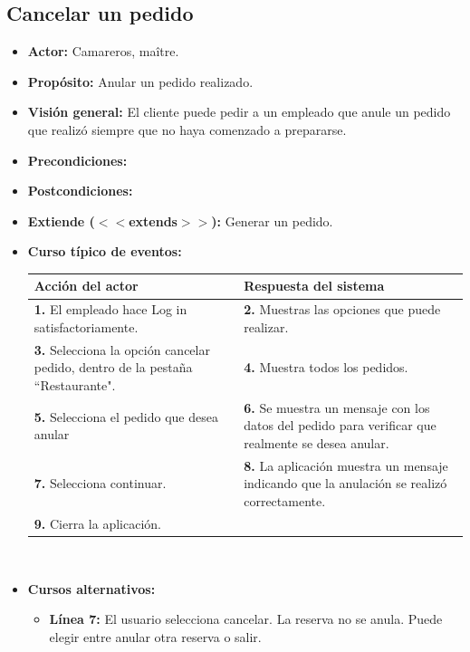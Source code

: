 \documentclass[spanish,a4paper,11pt, twoside]{report}	%
\begin{document}
		\subsection{Cancelar un pedido}
			\begin{itemize}
			\item \textbf{Actor:} Camareros, maître.
			\item \textbf{Propósito: } Anular un pedido realizado.
			\item \textbf{Visión general:} El cliente puede pedir a un empleado que anule un pedido que realizó siempre que no haya comenzado a prepararse.
			\item \textbf{Precondiciones:} 
			\item \textbf{Postcondiciones:} 
			\item \textbf{Extiende ($<<$extends$>>$):} Generar un pedido.
			\item \textbf{Curso típico de eventos:} 	\\
				\begin{tabular}{|p{6cm}||p{6cm}|}
				\hline
				\textbf{Acción del actor} & \textbf{Respuesta del sistema} \\ \hline \hline
				\textbf{1.} El empleado hace Log in satisfactoriamente. & \textbf{2.} Muestras las opciones que puede realizar. \\ \hline
				\textbf{3.} Selecciona la opción cancelar pedido, dentro de la pestaña “Restaurante". & \textbf{4.} Muestra todos los pedidos. \\ \hline
				\textbf{5.} Selecciona el pedido que desea anular	& \textbf{6.} Se muestra un mensaje con los datos del pedido para verificar que realmente se desea anular. \\ \hline
				\textbf{7.} Selecciona continuar.	& \textbf{8.} La aplicación muestra un mensaje indicando que la anulación se realizó correctamente. \\ \hline
				\textbf{9.} Cierra la aplicación. &  \\ \hline
			\end{tabular}
			\\
			\item \textbf{Cursos alternativos:} 
			\begin{itemize}
			\item  \textbf{Línea 7:} El usuario selecciona cancelar. La reserva no se anula. Puede elegir entre anular otra reserva o salir.
			\end {itemize}
		\end {itemize}
		
\end{document}

